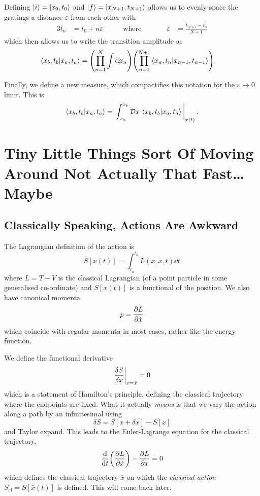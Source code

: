 \documentclass[]{revision-notes}
\begin{document}
Defining \(\ket{i} = \ket{x_0, t_0} \) and \( \ket{f} = \ket{x_{N+1}, t_{N+1}} \) allows us to evenly space the gratings a distance \( \varepsilon \) from each other with
\begin{alignat*}{3}
  t_n &= t_0 + n\varepsilon & \qquad \text{where}&\qquad& \varepsilon &= \frac{t_{N+1} - t_0}{N+1}
\end{alignat*}
which then allows us to write the transition amplitude as
\begin{align*}
  \braket{x_b, t_b}{x_a, t_a} &= \qty(\prod_{n=1}^{N}\int\dd{x_n})\qty(\prod_{n=1}^{N+1}\braket{x_{n}, t_{n}}{x_{n-1}, t_{n-1}}).
\end{align*}

Finally, we define a new measure, which compactifies this notation for the \(\varepsilon \to 0 \) limit.
This is \[ \braket{x_b, t_b}{x_a, t_a} =  \eval{\int_{x_a}^{x_b}\DD{x}\braket{x_b, t_b}{x_a, t_a}}_{x(t)}. \]

\chapter{Tiny Little Things Sort Of Moving Around Not Actually That Fast\ldots{} Maybe}
\section{Classically Speaking, Actions Are Awkward}
The Lagrangian definition of the action is \[ S[x(t)] = \int_{t_a}^{t_b} L(x, \dot{x}, t) \dd{t} \]
where \(L = T-V \) is the classical Lagrangian (of a point particle in some generalised co-ordinate) and \(S[x(t)]\) is a functional of the position. We also have canonical momenta \[ p = \pdv{L}{\dot{x}} \] which coincide with regular momenta in most cases, rather like the energy function.

We define the functional derivative
\[ \eval{\frac{\delta S}{\delta x}}_{x = \bar x} = 0 \] which is a statement of Hamilton's principle, defining the classical trajectory where the endpoints are fixed. What it actually \emph{means} is that we vary the action along a path by an infinitesimal using \[ \delta S = S[x + \delta x] - S[x] \] and Taylor expand. This leads to the Euler-Lagrange equation for the classical trajectory, \[ \dv{t}(\pdv{L}{\dot x}) - \pdv{L}{x} = 0 \] which defines the classical trajectory \(\bar{x} \) on which the \emph{classical action}
\(S_{\mathrm{cl}} = S[\bar x(t)]\) is defined. This will come back later.
\end{document}
